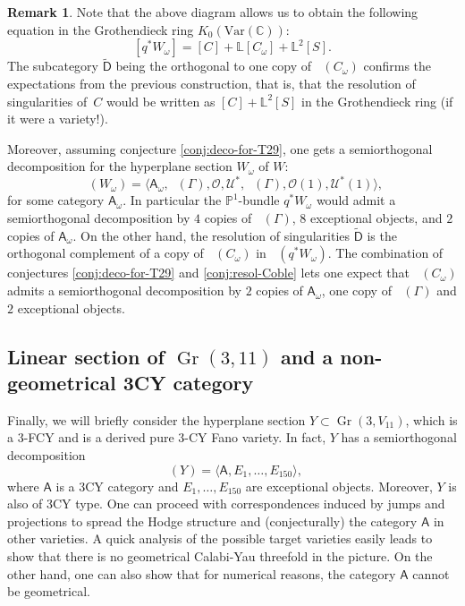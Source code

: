 \documentclass[11pt]{article}
\newcommand{\Var}{\mathrm{Var}}
\let\mathcal\mathscr
\theoremstyle{plain}
\theoremstyle{definition}
\newtheorem{remark}[theorem]{Remark}
\newcommand{\cat}[1]{\mathsf{#1}}
\newcommand{\sod}[1]{\langle #1 \rangle}
\DeclareMathOperator{\Db}{{\cat{D}^{\mathrm{b}}}}
\DeclareMathOperator{\Gr}{Gr}
\newcommand{\CC}{\mathbb{C}}
\newcommand{\LL}{\mathbb{L}}
\newcommand{\PP}{\mathbb{P}}
\newcommand{\sheaf}[1]{\mathcal{#1}}
\newcommand{\ko}{\sheaf{O}}\let\OO\ko\let\cO\ko
\newcommand{\ku}{\sheaf{U}}
\begin{document}
\begin{remark}
Note that the above diagram allows us to obtain the following equation in the Grothendieck ring
$K_0(\Var(\CC))$:
\[
[q^* W_\omega] = [C] + \LL [C_\omega] + \LL^2 [S].
\]
The subcategory $\tilde{\cat{D}}$ being the orthogonal to one copy of $\Db(C_\omega)$ confirms
the expectations from the previous construction, that is, that the resolution of singularities of~$C$ would be written as $[C] + \LL^2 [S]$ in the Grothendieck ring (if it were a variety!).

Moreover, assuming conjecture \ref{conj:deco-for-T29}, one gets a semiorthogonal decomposition
for the hyperplane section $W_\omega$ of $W$:
\[
\Db(W_\omega) = \sod{\cat{A}_\omega,\Db(\Gamma),\ko,\ku^*,\Db(\Gamma),\ko(1),\ku^*(1)},
\]
for some category $\cat{A}_\omega$. In particular the $\PP^1$-bundle $q^* W_\omega$ would admit
a semiorthogonal decomposition by $4$ copies of $\Db(\Gamma)$, $8$ exceptional objects, and $2$ copies
of $\cat{A}_\omega$. On the other hand, the resolution of singularities $\tilde{\cat{D}}$ is the orthogonal
complement of a copy of $\Db(C_\omega)$ in $\Db(q^*W_\omega)$. The combination of conjectures
\ref{conj:deco-for-T29} and \ref{conj:resol-Coble} lets one expect that $\Db(C_\omega)$
admits a semiorthogonal decomposition by $2$ copies of $\cat{A}_\omega$, one copy of $\Db(\Gamma)$
and $2$ exceptional objects.
\end{remark}

\subsection{Linear section of $\Gr(3,11)$ and a non-geometrical 3CY category}
Finally, we will briefly consider the hyperplane section $Y \subset \Gr(3,V_{11})$, which is a 3-FCY and is a derived pure 3-CY Fano variety. In fact, $Y$ has a semiorthogonal
decomposition
\[
\Db(Y)= \sod{\cat{A},E_1,\ldots,E_{150}},
\]
where $\cat{A}$ is a 3CY category \cite{kuz-fractional} and $E_1,\ldots,E_{150}$ are
exceptional objects. Moreover, $Y$ is also of 3CY type. One can proceed with correspondences
induced by jumps and projections to spread the Hodge structure and (conjecturally) the category $\cat{A}$
in other varieties. A quick analysis of the possible target varieties easily leads to show that there is
no geometrical Calabi-Yau threefold in the picture. On the other hand, one can also show that
for numerical reasons, the category $\cat{A}$ cannot be geometrical.
\end{document}
